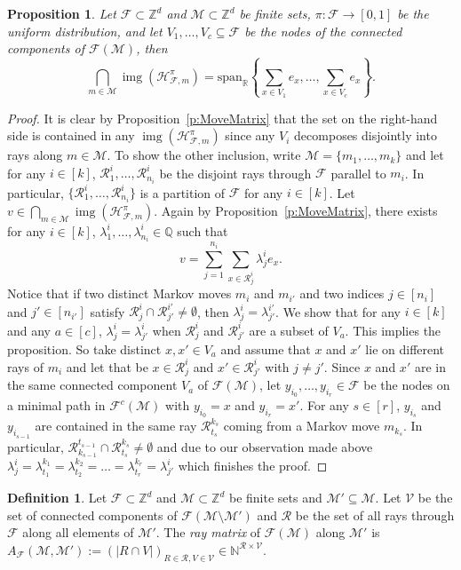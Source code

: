 \documentclass[11pt]{amsart}
\newtheorem{prop}[thm]{Proposition}
\theoremstyle{definition}
\newtheorem{defn}[thm]{Definition}
\numberwithin{equation}{section}
\newcommand{\ring}[1]{\ensuremath{\mathbb{#1}}}
\renewcommand{\>}{\rangle}
\newcommand{\<}{\langle}
\newcommand{\0}{\mathbf{0}}
\newcommand{\1}{\mathbf{1}}
\newcommand{\2}{\mathbf{2}}
\newcommand\NN{\ring{N}}
\newcommand\QQ{\ring{Q}}
\newcommand\RR{\ring{R}}
\newcommand\ZZ{\ring{Z}}
\newcommand\cF{{\mathcal F}}
\newcommand\cM{{\mathcal M}}
\newcommand\cR{{\mathcal R}}
\newcommand\cV{{\mathcal V}}
\DeclareMathOperator\img{img} %
\newcommand{\rayMat}[3]{A_{#1}(#2,#3)}
\newcommand{\heatbathmove}[3]{\mathcal{H}^{#1}_{#2,#3}}
\newcommand{\spann}[1]{\mathrm{span}_\RR\left\{#1\right\}}
\begin{document}
\begin{prop}\label{p:IntersectionTheorem}
Let $\cF\subset\ZZ^d$ and $\cM\subset\ZZ^d$ be finite sets,
$\pi:\cF\to[0,1]$ be the uniform distribution, and let
$V_1,\dots,V_c\subseteq\cF$ be the nodes of the connected components of
$\cF(\cM)$, then
$$\bigcap_{m\in\cM}\img(\heatbathmove{\pi}{\cF}m)=\spann{\sum_{x\in
V_1}e_x,\dots,\sum_{x\in V_c}e_x}.$$
\end{prop}
\begin{proof}
It is clear by Proposition~\ref{p:MoveMatrix} that the set
on the right-hand side is contained in any
$\img(\heatbathmove{\pi}{\cF}m)$ since any $V_i$ decomposes disjointly into rays
along $m\in\cM$.
To show the other inclusion, write $\cM=\{m_1,\dots,m_k\}$ and let for any $i\in[k]$,
$\cR^i_1,\dots,\cR^i_{n_i}$ be the disjoint rays through $\cF$ parallel
to $m_i$. In particular, $\{\cR^i_1,\dots,\cR^i_{n_i}\}$ is a
partition of $\cF$ for any $i\in[k]$. Let $v\in\bigcap_{m\in\cM}\img(\heatbathmove{\pi}{\cF}m)$.
Again by Proposition~\ref{p:MoveMatrix}, there exists for any
$i\in[k]$, $\lambda^i_1,\dots,\lambda^i_{n_i}\in\QQ$ such that
\begin{equation*}
v=\sum_{j=1}^{n_i}\sum_{x\in\cR^i_j}\lambda_j^ie_x.
\end{equation*}
Notice that if two distinct Markov moves $m_i$ and $m_{i'}$
and two indices $j\in[n_i]$ and $j'\in[n_{i'}]$
satisfy $\cR_{j}^i\cap\cR^{i'}_{j'}\neq\emptyset$,
then $\lambda^i_j=\lambda^{i'}_{j'}$. We show that for
any $i\in[k]$ and any $a\in[c]$, $\lambda_{j}^i=\lambda_{j'}^i$ when
$\cR^i_j$ and $\cR^i_{j'}$ are a subset of $V_a$. This implies the
proposition. So take distinct $x,x'\in V_a$
and assume that $x$ and $x'$ lie on different rays of
$m_i$ and let that be $x\in\cR^i_{j}$ and $x'\in\cR^i_{j'}$ with
$j\neq j'$. Since $x$ and $x'$ are in the same connected component
$V_a$ of $\cF(\cM)$, let $y_{i_0},\dots,y_{i_r}\in\cF$ be the nodes on a
minimal path in $\cF^c(\cM)$ with $y_{i_0}=x$ and $y_{i_r}=x'$. For any $s\in[r]$,
$y_{i_s}$ and $y_{i_{s-1}}$ are contained in the same ray
$\cR^{k_s}_{t_s}$ coming from a
Markov move $m_{k_s}$. In particular,
$\cR_{k_{s-1}}^{t_{s-1}}\cap\cR^{k_s}_{t_s}\neq\emptyset$ and due to
our observation made above
$\lambda_{j}^i=\lambda_{t_1}^{k_1}=\lambda_{t_2}^{k_2}=\dots=\lambda_{t_r}^{k_r}=\lambda_{j'}^i$
which finishes the proof.
\end{proof}

\begin{defn}\label{d:RayMatrix}
Let $\cF\subset\ZZ^d$ and $\cM\subset\ZZ^d$ be finite sets and
$\cM'\subseteq\cM$. Let $\mathcal{V}$ be the set of
connected components of $\cF(\cM\setminus\cM')$ and
$\cR$ be the set of all rays through $\cF$ along all elements
of $\cM'$. The \emph{ray matrix} of $\cF(\cM)$ along $\cM'$
is
$\rayMat{\cF}{\cM}{\cM'}:=(|R\cap
V|)_{R\in\cR,V\in\cV}\in\NN^{\cR\times\cV}$.
\end{defn}
\end{document}
